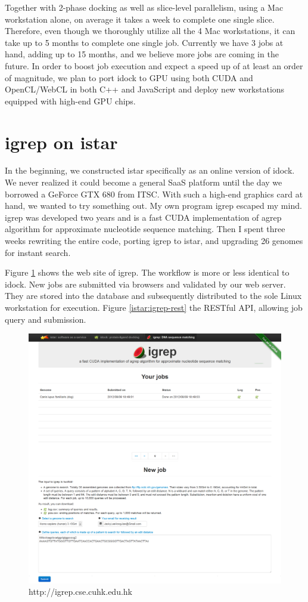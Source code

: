Together with 2-phase docking as well as slice-level parallelism, using a Mac workstation alone, on average it takes a week to complete one single slice. Therefore, even though we thoroughly utilize all the 4 Mac workstations, it can take up to 5 months to complete one single job. Currently we have 3 jobs at hand, adding up to 15 months, and we believe more jobs are coming in the future. In order to boost job execution and expect a speed up of at least an order of magnitude, we plan to port idock to GPU using both CUDA and OpenCL/WebCL in both C++ and JavaScript and deploy new workstations equipped with high-end GPU chips.

\section{igrep on istar}

In the beginning, we constructed istar specifically as an online version of idock. We never realized it could become a general SaaS platform until the day we borrowed a GeForce GTX 680 from ITSC. With such a high-end graphics card at hand, we wanted to try something out. My own program igrep \citep{1138} escaped my mind. igrep was developed two years and is a fast CUDA implementation of agrep algorithm for approximate nucleotide sequence matching. Then I spent three weeks rewriting the entire code, porting igrep to istar, and upgrading 26 genomes for instant search.

Figure \ref{istar:igrep} shows the web site of igrep. The workflow is more or less identical to idock. New jobs are submitted via browsers and validated by our web server. They are stored into the database and subsequently distributed to the sole Linux workstation for execution. Figure \ref{istar:igrep-rest} the RESTful API, allowing job query and submission.

\begin{figure}
\centering
\includegraphics[width=\linewidth]{istar/igrep.png}
\caption{http://igrep.cse.cuhk.edu.hk}
\label{istar:igrep}
\end{figure}


